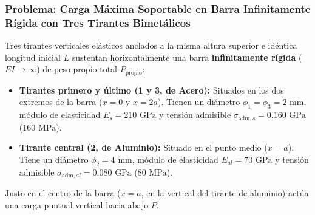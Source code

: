 \subsubsection{Problema: Carga Máxima Soportable en Barra Infinitamente Rígida con Tres Tirantes Bimetálicos}

Tres tirantes verticales elásticos anclados a la misma altura superior e idéntica longitud inicial $L$ sustentan horizontalmente una barra \textbf{infinitamente rígida} ($EI \to \infty$) de peso propio total $P_{\text{propio}}$:
\begin{itemize}
    \item \textbf{Tirantes primero y último (1 y 3, de Acero):} Situados en los dos extremos de la barra ($x = 0$ y $x = 2a$). Tienen un diámetro $\phi_1 = \phi_3 = 2\text{ mm}$, módulo de elasticidad $E_s = 210\text{ GPa}$ y tensión admisible $\sigma_{\text{adm}, s} = 0.160\text{ GPa}$ ($160\text{ MPa}$).
    \item \textbf{Tirante central (2, de Aluminio):} Situado en el punto medio ($x = a$). Tiene un diámetro $\phi_2 = 4\text{ mm}$, módulo de elasticidad $E_{al} = 70\text{ GPa}$ y tensión admisible $\sigma_{\text{adm}, al} = 0.080\text{ GPa}$ ($80\text{ MPa}$).
\end{itemize}
Justo en el centro de la barra ($x = a$, en la vertical del tirante de aluminio) actúa una carga puntual vertical hacia abajo $P$.

